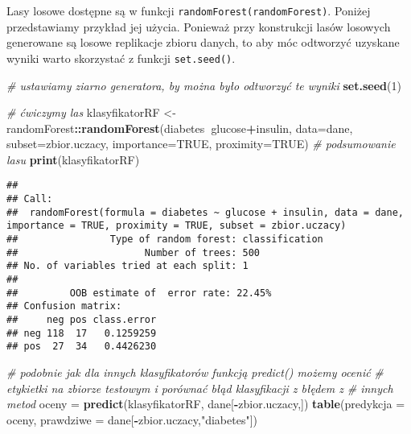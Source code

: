 \documentclass[polish,]{book}
\newenvironment{Shaded}{\begin{snugshade}}{\end{snugshade}}
\newcommand{\CommentTok}[1]{\textcolor[rgb]{0.56,0.35,0.01}{\textit{#1}}}
\newcommand{\DataTypeTok}[1]{\textcolor[rgb]{0.13,0.29,0.53}{#1}}
\newcommand{\DecValTok}[1]{\textcolor[rgb]{0.00,0.00,0.81}{#1}}
\newcommand{\KeywordTok}[1]{\textcolor[rgb]{0.13,0.29,0.53}{\textbf{#1}}}
\newcommand{\NormalTok}[1]{#1}
\newcommand{\OperatorTok}[1]{\textcolor[rgb]{0.81,0.36,0.00}{\textbf{#1}}}
\newcommand{\OtherTok}[1]{\textcolor[rgb]{0.56,0.35,0.01}{#1}}
\newcommand{\StringTok}[1]{\textcolor[rgb]{0.31,0.60,0.02}{#1}}
\begin{document}
Lasy losowe dostępne są w funkcji \texttt{randomForest(randomForest)}. Poniżej przedstawiamy przykład jej użycia. Ponieważ przy konstrukcji lasów losowych generowane
są losowe replikacje zbioru danych, to aby móc odtworzyć uzyskane wyniki warto
skorzystać z funkcji \texttt{set.seed()}.

\begin{Shaded}
\begin{Highlighting}[]
\CommentTok{# ustawiamy ziarno generatora, by można było odtworzyć te wyniki}
\KeywordTok{set.seed}\NormalTok{(}\DecValTok{1}\NormalTok{)}

\CommentTok{# ćwiczymy las}
\NormalTok{klasyfikatorRF <-}\StringTok{ }\NormalTok{randomForest}\OperatorTok{::}\KeywordTok{randomForest}\NormalTok{(diabetes}\OperatorTok{~}\NormalTok{glucose}\OperatorTok{+}\NormalTok{insulin,}
                                             \DataTypeTok{data=}\NormalTok{dane,}
                                             \DataTypeTok{subset=}\NormalTok{zbior.uczacy, }\DataTypeTok{importance=}\OtherTok{TRUE}\NormalTok{, }\DataTypeTok{proximity=}\OtherTok{TRUE}\NormalTok{)}
\CommentTok{# podsumowanie lasu}
\KeywordTok{print}\NormalTok{(klasyfikatorRF)}
\end{Highlighting}
\end{Shaded}

\begin{verbatim}
## 
## Call:
##  randomForest(formula = diabetes ~ glucose + insulin, data = dane,      importance = TRUE, proximity = TRUE, subset = zbior.uczacy) 
##                Type of random forest: classification
##                      Number of trees: 500
## No. of variables tried at each split: 1
## 
##         OOB estimate of  error rate: 22.45%
## Confusion matrix:
##     neg pos class.error
## neg 118  17   0.1259259
## pos  27  34   0.4426230
\end{verbatim}

\begin{Shaded}
\begin{Highlighting}[]
\CommentTok{# podobnie jak dla innych klasyfikatorów funkcją predict() możemy ocenić}
\CommentTok{# etykietki na zbiorze testowym i porównać błąd klasyfikacji z błędem z}
\CommentTok{# innych metod}
\NormalTok{oceny =}\StringTok{ }\KeywordTok{predict}\NormalTok{(klasyfikatorRF, dane[}\OperatorTok{-}\NormalTok{zbior.uczacy,])}
\KeywordTok{table}\NormalTok{(}\DataTypeTok{predykcja =}\NormalTok{ oceny, }\DataTypeTok{prawdziwe =}\NormalTok{ dane[}\OperatorTok{-}\NormalTok{zbior.uczacy,}\StringTok{"diabetes"}\NormalTok{])}
\end{Highlighting}
\end{Shaded}
\end{document}
